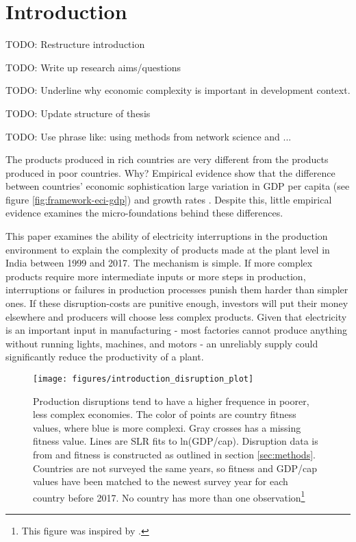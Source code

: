 \documentclass[11pt]{article}
\begin{document}
% 






\section{Introduction}\label{sec:introduction}

TODO: Restructure introduction

TODO: Write up research aims/questions

TODO: Underline why economic complexity is important in development context.

TODO: Update structure of thesis

TODO: Use phrase like: using methods from network science and ...

The products produced in rich countries are very different from the products produced in poor countries. Why? Empirical evidence show that the difference between countries' economic sophistication large variation in GDP per capita (see figure \ref{fig:framework-eci-gdp}) and growth rates \citep{tacchella_dynamical_2018}. Despite this, little empirical evidence examines the micro-foundations behind these differences. 

This paper examines the ability of electricity interruptions in the production environment to explain the complexity of products made at the plant level in India between 1999 and 2017. The mechanism is simple. If more complex products require more intermediate inputs or more steps in production, interruptions or failures in production processes punish them harder than simpler ones. If these disruption-costs are punitive enough, investors will put their money elsewhere and producers will choose less complex products. Given that electricity is an important input in manufacturing -  most factories cannot produce anything without running lights, machines, and motors - an unreliably supply could significantly reduce the productivity of a plant.

\begin{figure}[htpb]
	\centering
	\texttt{[image: figures/introduction\_disruption\_plot]}
	\caption{Production disruptions tend to have a higher frequence in poorer, less complex economies. The color of points are country fitness values, where blue is more complexi. Gray crosses has a missing fitness value. Lines are SLR fits to ln(GDP/cap). Disruption data is from \cite{world_bank_enterprise_2020} and fitness is constructed as outlined in section \ref{sec:methods}. Countries are not surveyed the same years, so fitness and GDP/cap values have been matched to the newest survey year for each country before 2017. No country has more than one observation\footnote{This figure was inspired by \cite{brummitt_contagious_2017}.}}
	\label{fig:disruption-fig}
\end{figure}
\end{document}

